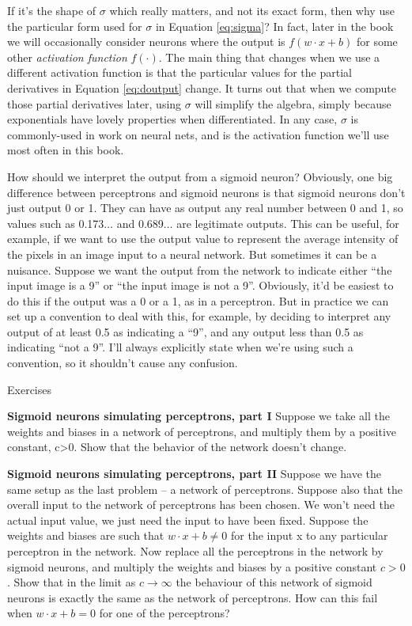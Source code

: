 \documentclass[a4paper,twoside,10pt]{book}
\begin{document}
If it's the shape of $\sigma$ which really matters, and not its exact form, then why use the particular form used for $\sigma$ in Equation \ref{eq:sigma}? In fact, later in the book we will occasionally consider neurons where the output is $f(w\cdot x + b)$ for some other \textit{activation function} $f(\cdot)$. The main thing that changes when we use a different activation function is that the particular values for the partial derivatives in Equation \ref{eq:doutput} change. It turns out that when we compute those partial derivatives later, using $\sigma$ will simplify the algebra, simply because exponentials have lovely properties when differentiated. In any case, $\sigma$ is commonly-used in work on neural nets, and is the activation function we'll use most often in this book.

How should we interpret the output from a sigmoid neuron? Obviously, one big difference between perceptrons and sigmoid neurons is that sigmoid neurons don't just output 0 or 1. They can have as output any real number between 0 and 1, so values such as 0.173$\ldots$ and 0.689$\ldots$ are legitimate outputs. This can be useful, for example, if we want to use the output value to represent the average intensity of the pixels in an image input to a neural network. But sometimes it can be a nuisance. Suppose we want the output from the network to indicate either ``the input image is a 9'' or ``the input image is not a 9''. Obviously, it'd be easiest to do this if the output was a 0 or a 1, as in a perceptron. But in practice we can set up a convention to deal with this, for example, by deciding to interpret any output of at least 0.5 as indicating a ``9'', and any output less than 0.5 as indicating ``not a 9''. I'll always explicitly state when we're using such a convention, so it shouldn't cause any confusion.

\begin{exercize}{Exercises}
\item \textbf{Sigmoid neurons simulating perceptrons, part I} Suppose we take all the weights and biases in a network of perceptrons, and multiply them by a positive constant, c>0. Show that the behavior of the network doesn't change.

\item \textbf{Sigmoid neurons simulating perceptrons, part II} Suppose we have the same setup as the last problem -- a network of perceptrons. Suppose also that the overall input to the network of perceptrons has been chosen. We won't need the actual input value, we just need the input to have been fixed. Suppose the weights and biases are such that $w\cdot x + b \ne 0$ for the input x to any particular perceptron in the network. Now replace all the perceptrons in the network by sigmoid neurons, and multiply the weights and biases by a positive constant $c>0$. Show that in the limit as $c\to\infty$ the behaviour of this network of sigmoid neurons is exactly the same as the network of perceptrons. How can this fail when $w\cdot x+b=0$ for one of the perceptrons?
\end{exercize}
\end{document}
